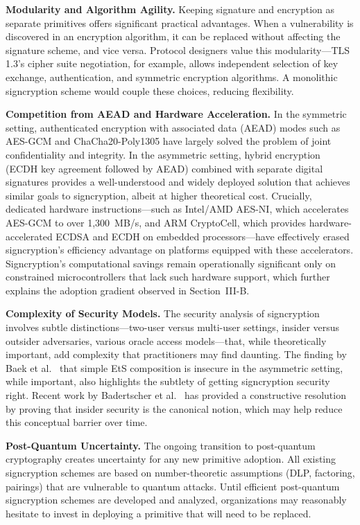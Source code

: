 \documentclass[conference]{IEEEtran}
\begin{document}
\textbf{Modularity and Algorithm Agility.} Keeping signature and encryption as separate primitives offers significant practical advantages. When a vulnerability is discovered in an encryption algorithm, it can be replaced without affecting the signature scheme, and vice versa. Protocol designers value this modularity---TLS 1.3's cipher suite negotiation, for example, allows independent selection of key exchange, authentication, and symmetric encryption algorithms. A monolithic signcryption scheme would couple these choices, reducing flexibility.

\textbf{Competition from AEAD and Hardware Acceleration.} In the symmetric setting, authenticated encryption with associated data (AEAD) modes such as AES-GCM and ChaCha20-Poly1305 have largely solved the problem of joint confidentiality and integrity. In the asymmetric setting, hybrid encryption (ECDH key agreement followed by AEAD) combined with separate digital signatures provides a well-understood and widely deployed solution that achieves similar goals to signcryption, albeit at higher theoretical cost. Crucially, dedicated hardware instructions---such as Intel/AMD AES-NI, which accelerates AES-GCM to over 1,300~MB/s, and ARM CryptoCell, which provides hardware-accelerated ECDSA and ECDH on embedded processors---have effectively erased signcryption's efficiency advantage on platforms equipped with these accelerators. Signcryption's computational savings remain operationally significant only on constrained microcontrollers that lack such hardware support, which further explains the adoption gradient observed in Section~III-B.

\textbf{Complexity of Security Models.} The security analysis of signcryption involves subtle distinctions---two-user versus multi-user settings, insider versus outsider adversaries, various oracle access models---that, while theoretically important, add complexity that practitioners may find daunting. The finding by Baek et al.~\cite{baek2002} that simple EtS composition is insecure in the asymmetric setting, while important, also highlights the subtlety of getting signcryption security right. Recent work by Badertscher et al.~\cite{badertscher2018} has provided a constructive resolution by proving that insider security is the canonical notion, which may help reduce this conceptual barrier over time.

\textbf{Post-Quantum Uncertainty.} The ongoing transition to post-quantum cryptography creates uncertainty for any new primitive adoption. All existing signcryption schemes are based on number-theoretic assumptions (DLP, factoring, pairings) that are vulnerable to quantum attacks. Until efficient post-quantum signcryption schemes are developed and analyzed, organizations may reasonably hesitate to invest in deploying a primitive that will need to be replaced.
\end{document}
